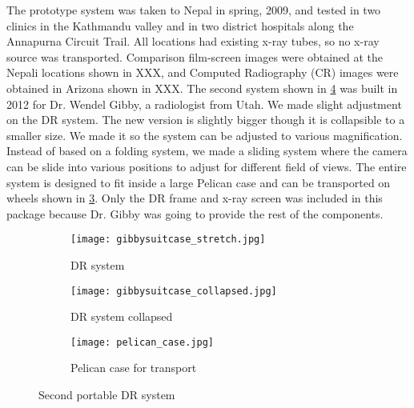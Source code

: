 The prototype system was taken to Nepal in spring, 2009, and tested in two clinics in the Kathmandu valley and in two district hospitals along the Annapurna Circuit Trail.  All locations had existing x-ray tubes, so no x-ray source was transported. Comparison film-screen images were obtained at the Nepali locations shown in XXX, and Computed Radiography (CR) images were obtained in Arizona shown in XXX.
The second system shown in \ref{fig:DR2} was built in 2012 for Dr. Wendel Gibby, a radiologist from Utah.  We made slight adjustment on the DR system.  The new version is slightly bigger though it is collapsible to a smaller size.  We made it so the system can be adjusted to various magnification.  Instead of based on a folding system, we made a sliding system where the camera can be slide into various positions to adjust for different field of views.  The entire system is designed to fit inside a large Pelican case and can be transported on wheels shown in \ref{fig:pelicancase}.  Only the DR frame and x-ray screen was included in this package because Dr. Gibby was going to provide the rest of the components.  

\begin{figure}
	\begin{subfigure}[b]{0.3\linewidth}
	\centering
	\texttt{[image: gibbysuitcase\_stretch.jpg]}
	\caption{DR system}
	\label{DR2stretched}
	\end{subfigure}
\hspace{0.2cm}
	\begin{subfigure}[b]{0.3\linewidth}
	\centering
	\texttt{[image: gibbysuitcase\_collapsed.jpg]}
	\caption{DR system collapsed}
	\label{fig:DR2collapsed}
	\end{subfigure}
\hspace{0.2cm}	
	\begin{subfigure}[b]{0.3\linewidth}
	\centering
	\texttt{[image: pelican\_case.jpg]}
	\caption{Pelican case for transport}
	\label{fig:pelicancase}
	\end{subfigure}
\caption{Second portable DR system}
\label{fig:DR2}	
\end{figure}
	
